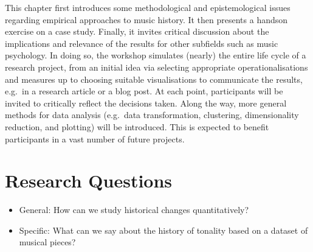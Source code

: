 \documentclass[letterpaper,10pt,english]{sphinxmanual}
\begin{document}
This chapter first introduces some methodological and epistemological
issues regarding empirical approaches to music history. It then presents
a hands\sphinxhyphen{}on exercise on a case study. Finally, it invites critical
discussion about the implications and relevance of the results for other
subfields such as music psychology. In doing so, the workshop simulates
(nearly) the entire life cycle of a research project, from an initial
idea via selecting appropriate operationalisations and measures up to
choosing suitable visualisations to communicate the results, e.g. in a
research article or a blog post. At each point, participants will be
invited to critically reflect the decisions taken. Along the way, more
general methods for data analysis (e.g. data transformation, clustering,
dimensionality reduction, and plotting) will be introduced. This is
expected to benefit participants in a vast number of future projects.

\begin{sphinxVerbatim}[commandchars=\\\{\}]
    
 
    
 
    
   
\end{sphinxVerbatim}


\section{Research Questions}
\label{\detokenize{data-driven_music_history:research-questions}}\begin{itemize}
\item {} 
General: How can we study historical changes quantitatively?

\item {} 
Specific: What can we say about the history of tonality based on a
dataset of musical pieces?

\end{itemize}
\end{document}
